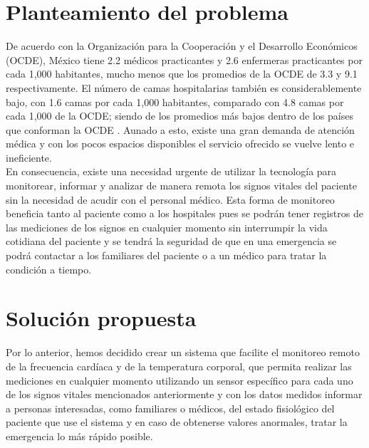 
\section{Planteamiento del problema}
De acuerdo con la Organización para la Cooperación y el Desarrollo Económicos (OCDE), México tiene 2.2 médicos practicantes y 2.6 enfermeras practicantes por cada 1,000 habitantes, mucho menos que los promedios de la OCDE de 3.3 y 9.1 respectivamente. El número de camas hospitalarias también es considerablemente bajo, con 1.6 camas por cada 1,000 habitantes, comparado con 4.8 camas por cada 1,000 de la OCDE; siendo de los promedios más bajos dentro de los países que conforman la OCDE \cite{ocde2016}. Aunado a esto, existe una gran demanda de atención médica y con los pocos espacios disponibles el servicio ofrecido se vuelve lento e ineficiente. \\

En consecuencia, existe una necesidad urgente de utilizar la tecnología para monitorear, informar y analizar de manera remota los signos vitales del paciente sin la necesidad de acudir con el personal médico. Esta forma de monitoreo beneficia tanto al paciente como a los hospitales pues se podrán tener registros de las mediciones de los signos en cualquier momento sin interrumpir la vida cotidiana del paciente y se tendrá la seguridad de que en una emergencia se podrá contactar a los familiares del paciente o a un médico para tratar la condición a tiempo.\\

\section{Solución propuesta}
Por lo anterior, hemos decidido crear un sistema que facilite el monitoreo remoto de la frecuencia cardíaca y de la temperatura corporal, que permita realizar las mediciones en cualquier momento utilizando un sensor específico para cada uno de los signos vitales mencionados anteriormente y con los datos medidos informar a personas interesadas, como familiares o médicos, del estado fisiológico del paciente que use el sistema y en caso de obtenerse valores anormales, tratar la emergencia lo más rápido posible.

